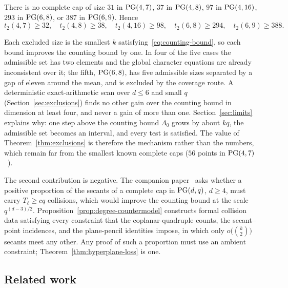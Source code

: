 \begin{theorem}[Exclusions]
\label{thm:exclusions}
There is no complete cap of size \(31\) in \(\mathrm{PG}(4,7)\), \(37\) in
\(\mathrm{PG}(4,8)\), \(97\) in \(\mathrm{PG}(4,16)\), \(293\) in \(\mathrm{PG}(6,8)\), or \(387\)
in \(\mathrm{PG}(6,9)\).  Hence
\[
 t_2(4,7)\ge32,\quad t_2(4,8)\ge38,\quad t_2(4,16)\ge98,\quad
 t_2(6,8)\ge294,\quad t_2(6,9)\ge388 .
\]
\end{theorem}

Each excluded size is the smallest \(k\) satisfying~\eqref{eq:counting-bound},
so each bound improves the counting bound by one.  In four of the five
cases the admissible set has two elements and the global character
equations are already inconsistent over it; the fifth, \(\mathrm{PG}(6,8)\), has
five admissible sizes separated by a gap of eleven around the mean, and is
excluded by the coverage route.  A deterministic exact-arithmetic scan
over \(d\le6\) and small \(q\) (Section~\ref{sec:exclusions}) finds no
other gain over the counting bound in dimension at least four, and never a
gain of more than one.  Section~\ref{sec:limits} explains why: one step
above the counting bound \(\Lambda_0\) grows by about \(kq\), the
admissible set becomes an interval, and every test is satisfied.  The value
of Theorem~\ref{thm:exclusions} is therefore the mechanism rather than the
numbers, which remain far from the smallest known complete caps
(\(56\) points in \(\mathrm{PG}(4,7)\)~\cite{BartoliDavydovKreshchukMarcuginiPambianco2016}).

The second contribution is negative.  The companion
paper~\cite{RuddSecantDefects} asks whether a positive proportion of the
secants of a complete cap in \(\mathrm{PG}(d,q)\), \(d\ge4\), must carry
\(T_\ell\ge cq\) collisions, which would improve the counting bound at the
scale \(q^{(d-3)/2}\).  Proposition~\ref{prop:degree-countermodel}
constructs formal collision data satisfying every constraint that the
coplanar-quadruple counts, the secant--point incidences, and the
plane-pencil identities impose, in which only \(o\bigl(\binom{k}{2}\bigr)\)
secants meet any other.  Any proof of such a proportion must use an
ambient constraint; Theorem~\ref{thm:hyperplane-loss} is one.

\subsection*{Related work}

